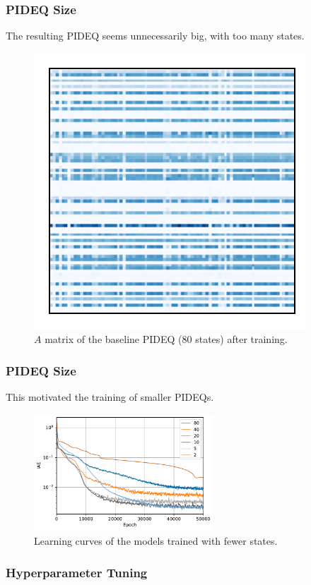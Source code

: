 \documentclass[t]{beamer}
\begin{document}
\begin{frame}
    \frametitle{PIDEQ Size}
    The resulting PIDEQ seems unnecessarily big, with too many states.
    \begin{figure}[h]
	\includegraphics[width=.4\textwidth]{../images/exp_1_matplot.pdf}
	\caption{$A$ matrix of the baseline PIDEQ (80 states) after training.}
	\label{fig:baseline-pideq-A}
    \end{figure}
\end{frame}

\begin{frame}
    \frametitle{PIDEQ Size}
    This motivated the training of smaller PIDEQs.
    \begin{figure}[h]
	\centering
	\includegraphics[width=0.6\textwidth]{../images/exp_2_iae.pdf}
	\caption{Learning curves of the models trained with fewer states.}
	\label{fig:states-iae}
    \end{figure}
\end{frame}

\begin{frame}
    \frametitle{Hyperparameter Tuning}

\end{frame}
\end{document}
